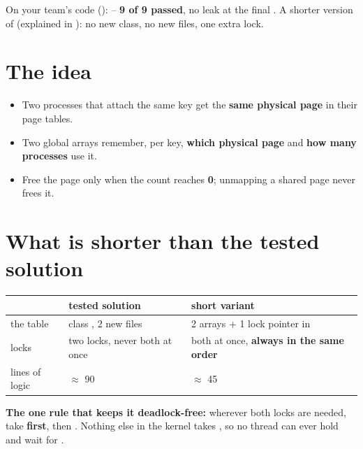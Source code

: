 \documentclass[11pt]{report}
\begin{document}
{\vspace{6pt}}

\begin{keybox}[title={Tested}]
On your team's code ():  -- \textbf{9 of 9 passed}, no leak at the final
. A shorter version of  (explained in ): no new class,
no new files, one extra lock.
\end{keybox}

\section*{The idea}

\begin{itemize}
  \item Two processes that attach the same key get the \textbf{same physical page} in their page tables.
  \item Two global arrays remember, per key, \textbf{which physical page} and \textbf{how many processes} use it.
  \item Free the page only when the count reaches \textbf{0}; unmapping a shared page never frees it.
\end{itemize}

\section*{What is shorter than the tested solution}

\begin{tabular}{@{}L{3.6cm} L{5.6cm} L{6.2cm}@{}}
\toprule
 & tested solution & short variant\\\midrule
the table & class , 2 new files & 2 arrays + 1 lock pointer in \\
locks & two locks, never both at once & both at once, \textbf{always in the same order}\\
lines of logic & $\approx$ 90 & $\approx$ 45\\
\bottomrule
\end{tabular}

\smallskip
\textbf{The one rule that keeps it deadlock-free:} wherever both locks are needed, take
 \textbf{first}, then . Nothing else in the kernel takes , so
no thread can ever hold  and wait for .
\end{document}
